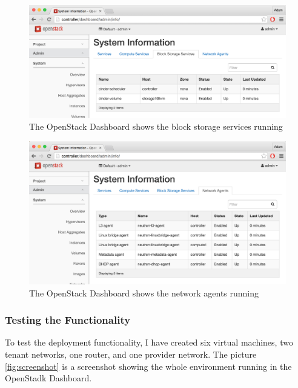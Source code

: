\begin{figure}[!h]
  \includegraphics[width=\textwidth]{fig/screenshot_storage.png}
  \caption{The OpenStack Dashboard shows the block storage services running}
  \label{fig:screenshot_storage}
\end{figure}


\begin{figure}[!h]
  \includegraphics[width=\textwidth]{fig/screenshot_network.png}
  \caption{The OpenStack Dashboard shows the network agents running}
  \label{fig:screenshot_network}
\end{figure}


\subsubsection{Testing the Functionality}

To test the deployment functionality, I have created six virtual machines, two tenant networks, one router, and one provider network. The picture \ref{fig:screenshot} is a screenshot showing the whole environment running in the OpenStadk Dashboard.


